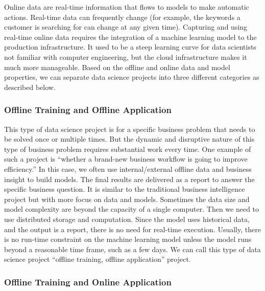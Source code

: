 \documentclass[12pt,]{krantz}
\begin{document}
Online data are real-time information that flows to models to make automatic actions. Real-time data can frequently change (for example, the keywords a customer is searching for can change at any given time). Capturing and using real-time online data requires the integration of a machine learning model to the production infrastructure. It used to be a steep learning curve for data scientists not familiar with computer engineering, but the cloud infrastructure makes it much more manageable. Based on the offline and online data and model properties, we can separate data science projects into three different categories as described below.

\hypertarget{offline-training-and-offline-application}{%
\subsubsection{Offline Training and Offline Application}\label{offline-training-and-offline-application}}

This type of data science project is for a specific business problem that needs to be solved once or multiple times. But the dynamic and disruptive nature of this type of business problem requires substantial work every time. One example of such a project is ``whether a brand-new business workflow is going to improve efficiency.'' In this case, we often use internal/external offline data and business insight to build models. The final results are delivered as a report to answer the specific business question. It is similar to the traditional business intelligence project but with more focus on data and models. Sometimes the data size and model complexity are beyond the capacity of a single computer. Then we need to use distributed storage and computation. Since the model uses historical data, and the output is a report, there is no need for real-time execution. Usually, there is no run-time constraint on the machine learning model unless the model runs beyond a reasonable time frame, such as a few days. We can call this type of data science project ``offline training, offline application'' project.

\hypertarget{offline-training-and-online-application}{%
\subsubsection{Offline Training and Online Application}\label{offline-training-and-online-application}}
\end{document}
